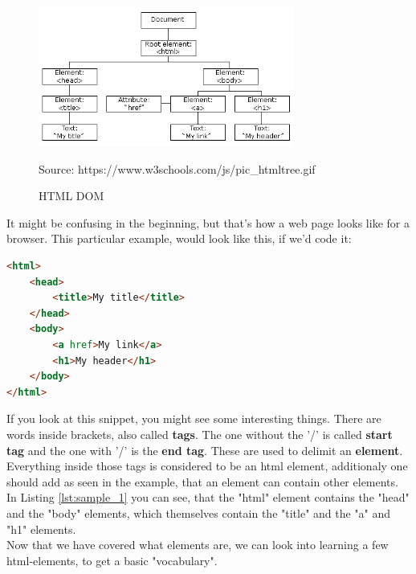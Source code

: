 \documentclass[a4paper,12pt]{article}
\newcommand{\source}[1]{\caption*{Source: {#1}} }
\begin{document}
\begin{figure}[h]
    \centering
    \includegraphics[width=0.75\textwidth]{imgs/dom-tree}
    \caption{HTML DOM}
    \label{fig:dom-tree}
    \source{https://www.w3schools.com/js/pic\_htmltree.gif}
\end{figure}

It might be confusing in the beginning, but that's how a web page looks like for a browser. This particular example, would look like this, if we'd code it:

\begin{lstlisting}[language=HTML,caption=DOM Example Page,label={lst:sample_1}]
<html>
    <head>
        <title>My title</title>
    </head>
    <body>
        <a href>My link</a>
        <h1>My header</h1>
    </body>
</html>
\end{lstlisting}

If you look at this snippet, you might see some interesting things. There are words inside brackets, also called \textbf{tags}. The one without the '/' is called \textbf{start tag} and the one with '/' is the \textbf{end tag}. These are used to delimit an \textbf{element}.\\ 
Everything inside those tags is considered to be an html element, additionaly one should add as seen in the example, that an element can contain other elements. In Listing \ref{lst:sample_1} you can see, that the "html" element contains the "head" and the "body" elements, which themselves contain the "title" and the "a" and "h1" elements.\\
Now that we have covered what elements are, we can look into learning a few html-elements, to get a basic "vocabulary".
\end{document}
